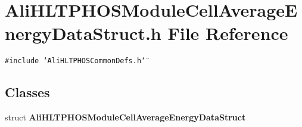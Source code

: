 \section{Ali\-HLTPHOSModule\-Cell\-Average\-Energy\-Data\-Struct.h File Reference}
\label{AliHLTPHOSModuleCellAverageEnergyDataStruct_8h}


{\tt \#include \char`\"{}Ali\-HLTPHOSCommon\-Defs.h\char`\"{}}\par
\subsection*{Classes}
\begin{CompactItemize}
\item 
struct {\bf Ali\-HLTPHOSModule\-Cell\-Average\-Energy\-Data\-Struct}
\end{CompactItemize}
